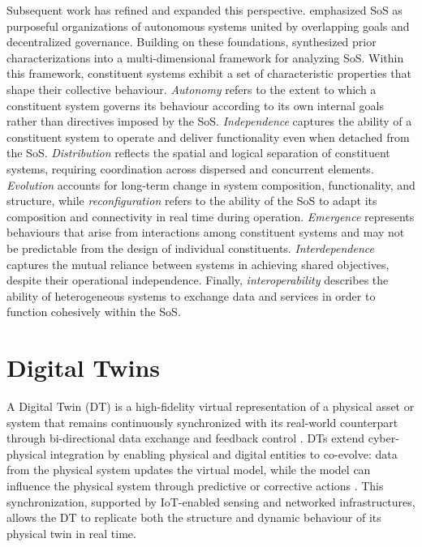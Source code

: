 Subsequent work has refined and expanded this perspective. \citet{boardman2006system} emphasized SoS as purposeful organizations of autonomous systems united by overlapping goals and decentralized governance. 
Building on these foundations, \citet{nielsen2015systems} synthesized prior characterizations into a multi-dimensional framework for analyzing SoS. Within this framework, constituent systems exhibit a set of characteristic properties that shape their collective behaviour. \textit{Autonomy} refers to the extent to which a constituent system governs its behaviour according to its own internal goals rather than directives imposed by the SoS. \textit{Independence} captures the ability of a constituent system to operate and deliver functionality even when detached from the SoS. \textit{Distribution} reflects the spatial and logical separation of constituent systems, requiring coordination across dispersed and concurrent elements. \textit{Evolution} accounts for long-term change in system composition, functionality, and structure, while \textit{reconfiguration} refers to the ability of the SoS to adapt its composition and connectivity in real time during operation. \textit{Emergence} represents behaviours that arise from interactions among constituent systems and may not be predictable from the design of individual constituents. \textit{Interdependence} captures the mutual reliance between systems in achieving shared objectives, despite their operational independence. Finally, \textit{interoperability} describes the ability of heterogeneous systems to exchange data and services in order to function cohesively within the SoS.



\section{Digital Twins}\label{sec:background-dt}
A Digital Twin (DT) is a high-fidelity virtual representation of a physical asset or system that remains continuously synchronized with its real-world counterpart through bi-directional data exchange and feedback control \cite{david2024infonomics}. DTs extend cyber-physical integration by enabling physical and digital entities to co-evolve: data from the physical system updates the virtual model, while the model can influence the physical system through predictive or corrective actions \cite{tao2018digital}. This synchronization, supported by IoT-enabled sensing and networked infrastructures, allows the DT to replicate both the structure and dynamic behaviour of its physical twin in real time.

